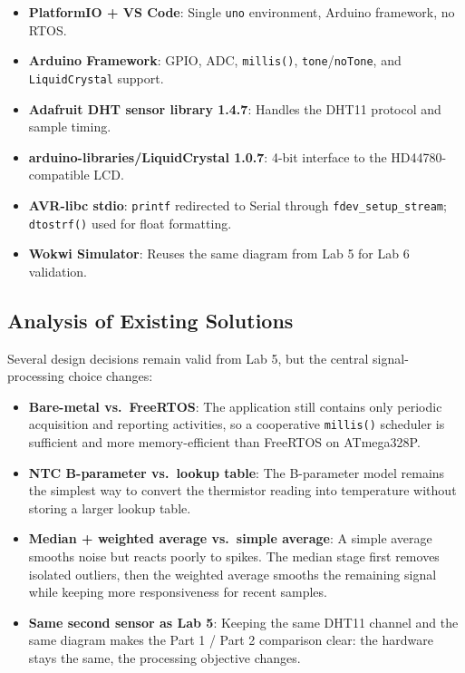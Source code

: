 \documentclass[12pt]{article}
\begin{document}
\begin{itemize}
    \item \textbf{PlatformIO + VS Code}: Single \texttt{uno} environment, Arduino framework, no RTOS.
    \item \textbf{Arduino Framework}: GPIO, ADC, \texttt{millis()}, \texttt{tone}/\texttt{noTone}, and \texttt{LiquidCrystal} support.
    \item \textbf{Adafruit DHT sensor library 1.4.7}: Handles the DHT11 protocol and sample timing.
    \item \textbf{arduino-libraries/LiquidCrystal 1.0.7}: 4-bit interface to the HD44780-compatible LCD.
    \item \textbf{AVR-libc stdio}: \texttt{printf} redirected to Serial through \texttt{fdev\_setup\_stream}; \texttt{dtostrf()} used for float formatting.
    \item \textbf{Wokwi Simulator}: Reuses the same diagram from Lab 5 for Lab 6 validation.
\end{itemize}

\subsection{Analysis of Existing Solutions}
\hspace{0.8cm} Several design decisions remain valid from Lab 5, but the central signal-processing choice changes:

\begin{itemize}
    \item \textbf{Bare-metal vs.\ FreeRTOS}: The application still contains only periodic acquisition and reporting activities, so a cooperative \texttt{millis()} scheduler is sufficient and more memory-efficient than FreeRTOS on ATmega328P.
    \item \textbf{NTC B-parameter vs.\ lookup table}: The B-parameter model remains the simplest way to convert the thermistor reading into temperature without storing a larger lookup table.
    \item \textbf{Median + weighted average vs.\ simple average}: A simple average smooths noise but reacts poorly to spikes. The median stage first removes isolated outliers, then the weighted average smooths the remaining signal while keeping more responsiveness for recent samples.
    \item \textbf{Same second sensor as Lab 5}: Keeping the same DHT11 channel and the same diagram makes the Part 1 / Part 2 comparison clear: the hardware stays the same, the processing objective changes.
\end{itemize}
\end{document}
